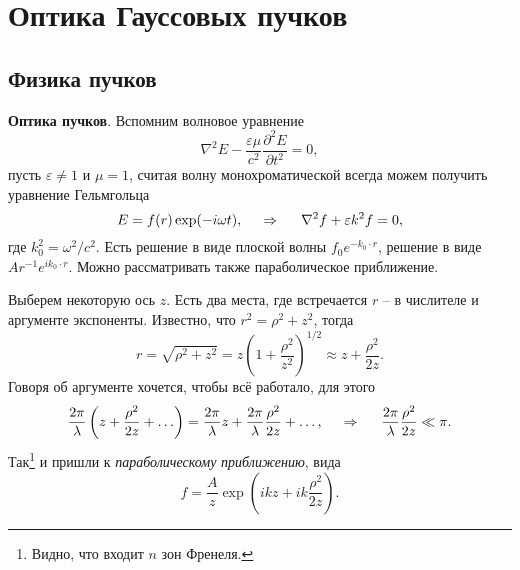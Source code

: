 \section{Оптика Гауссовых пучков}

\subsection{Физика пучков}

\textbf{Оптика пучков}. 
Вспомним волновое уравнение
\begin{equation*}
    \nabla^2 E - \frac{\varepsilon \mu}{c^2} \frac{\partial^2 E}{\partial t^2} = 0,
\end{equation*}
пусть $\varepsilon \neq 1$ и $\mu=1$, считая волну монохроматической всегда можем получить уравнение Гельмгольца
\begin{equation*}
    E = f(r) \exp(-i \omega t),
    \hspace{0.5cm} \Rightarrow \hspace{0.5cm}
    \nabla^2 f + \varepsilon k^2 f = 0,
\end{equation*}
где $k_0^2 = \omega^2/c^2$. Есть решение в виде плоской волны $f_0 e^{- k_0 \cdot r}$, решение в виде $A r^{-1} e^{i k_0 \cdot r}$. Можно рассматривать также параболическое приближение. 

Выберем некоторую ось $z$. Есть два места, где встречается $r$ -- в числителе и аргументе экспоненты. Известно, что $r^2 = \rho^2 + z^2$, тогда
\begin{equation*}
    r = \sqrt{\rho^2 + z^2} = z \left(1 + \frac{\rho^2}{z^2}\right)^{1/2} \approx z + \frac{\rho^2}{2z}.
\end{equation*}
Говоря об аргументе хочется, чтобы всё работало, для этого
\begin{equation*}
    \frac{2\pi}{\lambda} \left(z + \frac{\rho^2}{2z}+\ldots\right) = \frac{2\pi}{\lambda} z + \frac{2\pi}{\lambda} \frac{\rho^2}{2z} + \ldots,
    \hspace{0.5cm} \Rightarrow \hspace{0.5cm}
    \frac{2\pi}{\lambda} \frac{\rho^2}{2z} \ll \pi.
\end{equation*}
Так\footnote{
    Видно, что входит $n$ зон Френеля.
}  и пришли к \textit{параболическому} \textit{приближению}, вида
\begin{equation*}
    f = \frac{A}{z} \exp\left(
        i k z + i k \frac{\rho^2}{2z}
    \right).
\end{equation*}



